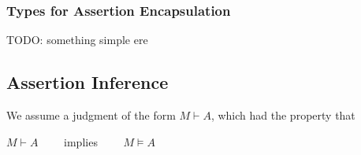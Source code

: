 \subsubsection{Types for Assertion Encapsulation}
\label{types}
TODO: something simple ere 
%
%

\subsection{Assertion Inference}

\begin{axiom}
We assume a judgment of the form $M \vdash A$, which had the property that\\
\strut \hspace{5cm} $M \vdash A $ \ \ \ \ implies \ \ \ \ $M \vDash A$
\end{axiom}



